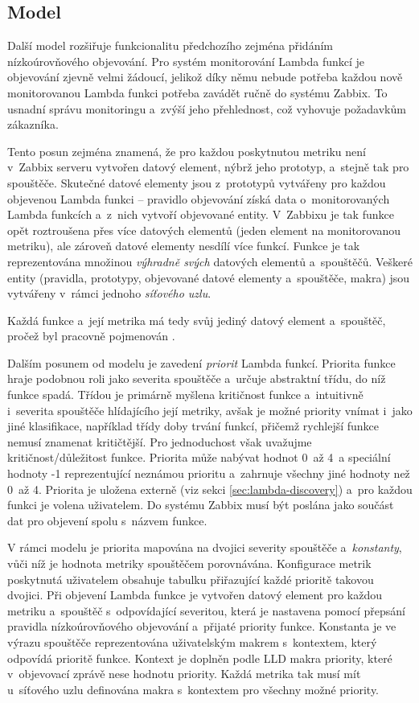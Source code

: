 \documentclass[czech, ing, kiv, he, iso690]{fasthesis}
\begin{document}
\subsection{Model }

Další model rozšiřuje funkcionalitu předchozího zejména přidáním nízkoúrovňového objevování. Pro systém monitorování Lambda funkcí je objevování zjevně velmi žádoucí, jelikož díky němu nebude potřeba každou nově monitorovanou Lambda funkci potřeba zavádět ručně do systému Zabbix. To usnadní správu monitoringu a~zvýší jeho přehlednost, což vyhovuje požadavkům zákazníka.

Tento posun zejména znamená, že pro každou poskytnutou metriku není v~Zabbix serveru vytvořen datový element, nýbrž jeho prototyp, a~stejně tak pro spouštěče. Skutečné datové elementy jsou z~prototypů vytvářeny pro každou objevenou Lambda funkci -- pravidlo objevování získá data o~monitorovaných Lambda funkcích a~z~nich vytvoří objevované entity. V~Zabbixu je tak funkce opět roztroušena přes více datových elementů (jeden element na monitorovanou metriku), ale zároveň datové elementy nesdílí více funkcí. Funkce je tak reprezentována množinou \emph{výhradně svých} datových elementů a~spouštěčů. Veškeré entity (pravidla, prototypy, objevované datové elementy a~spouštěče, makra) jsou vytvářeny v~rámci jednoho \emph{síťového uzlu}.

Každá funkce a~její metrika má tedy svůj jediný datový element a~spouštěč, pročež byl pracovně pojmenován .

Dalším posunem od modelu  je zavedení \emph{priorit} Lambda funkcí. Priorita funkce hraje podobnou roli jako severita spouštěče a~určuje abstraktní třídu, do níž funkce spadá. Třídou je primárně myšlena kritičnost funkce a~intuitivně i~severita spouštěče hlídajícího její metriky, avšak je možné priority vnímat i~jako jiné klasifikace, například třídy doby trvání funkcí, přičemž rychlejší funkce nemusí znamenat kritičtější. Pro jednoduchost však uvažujme kritičnost/důležitost funkce. Priorita může nabývat hodnot 0~až 4~a speciální hodnoty -1 reprezentující neznámou prioritu a~zahrnuje všechny jiné hodnoty než 0~až 4. Priorita je uložena externě (viz sekci \ref{sec:lambda-discovery}) a~pro každou funkci je volena uživatelem. Do systému Zabbix musí být poslána jako součást dat pro objevení spolu s~názvem funkce.

V rámci modelu  je priorita mapována na dvojici severity spouštěče a~\emph{konstanty}, vůči níž je hodnota metriky spouštěčem porovnávána. Konfigurace metrik poskytnutá uživatelem obsahuje tabulku přiřazující každé prioritě takovou dvojici. Při objevení Lambda funkce je vytvořen datový element pro každou metriku a~spouštěč s~odpovídající severitou, která je nastavena pomocí přepsání pravidla nízkoúrovňového objevování a~přijaté priority funkce. Konstanta je ve výrazu spouštěče reprezentována uživatelským makrem s~kontextem, který odpovídá prioritě funkce. Kontext je doplněn podle LLD makra priority, které v~objevovací zprávě nese hodnotu priority. Každá metrika tak musí mít u~síťového uzlu definována makra s~kontextem pro všechny možné priority.
\end{document}
